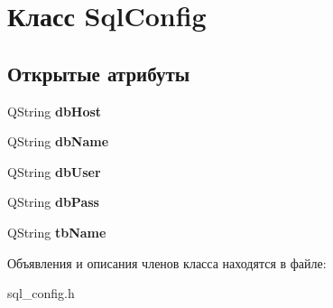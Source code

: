 \hypertarget{class_sql_config}{\section{Класс \-Sql\-Config}
\label{class_sql_config}
}
\subsection*{Открытые атрибуты}
\begin{DoxyCompactItemize}
\item 
\hypertarget{class_sql_config_ac63f4e3f60e9a02d638f68257a5f6d29}{\-Q\-String {\bfseries db\-Host}}\label{class_sql_config_ac63f4e3f60e9a02d638f68257a5f6d29}

\item 
\hypertarget{class_sql_config_adb6d3fcaff54e63b633a61e1c1a84a2a}{\-Q\-String {\bfseries db\-Name}}\label{class_sql_config_adb6d3fcaff54e63b633a61e1c1a84a2a}

\item 
\hypertarget{class_sql_config_a52baca84b275b6b60dc97b1dcba49398}{\-Q\-String {\bfseries db\-User}}\label{class_sql_config_a52baca84b275b6b60dc97b1dcba49398}

\item 
\hypertarget{class_sql_config_ac3d95a1258fd59ca1c7479d53ff2bbf5}{\-Q\-String {\bfseries db\-Pass}}\label{class_sql_config_ac3d95a1258fd59ca1c7479d53ff2bbf5}

\item 
\hypertarget{class_sql_config_a2d52c46d3a6d615f9ff4714905257953}{\-Q\-String {\bfseries tb\-Name}}\label{class_sql_config_a2d52c46d3a6d615f9ff4714905257953}

\end{DoxyCompactItemize}


Объявления и описания членов класса находятся в файле\-:\begin{DoxyCompactItemize}
\item 
sql\-\_\-config.\-h\end{DoxyCompactItemize}
